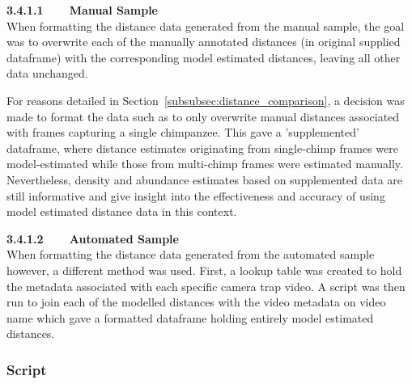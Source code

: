 \vspace{3mm}

\textbf{3.4.1.1~~~~Manual Sample}\vspace{4.5mm}\\
When formatting the distance data generated from the manual sample, the goal was to
overwrite each of the manually annotated distances (in original supplied dataframe)
with the corresponding model estimated distances, leaving all other data unchanged.

For reasons detailed in Section~\ref{subsubsec:distance_comparison}, a decision was
made to format the data such as to only overwrite manual distances associated with
frames capturing a single chimpanzee.
This gave a 'supplemented' dataframe, where distance estimates originating from
single-chimp frames were model-estimated while those from multi-chimp frames were
estimated manually.
Nevertheless, density and abundance estimates based on supplemented data are still
informative and give insight into the effectiveness and accuracy of using model estimated
distance data in this context.

\vspace{3mm}

\textbf{3.4.1.2~~~~Automated Sample}\vspace{4.5mm}\\
When formatting the distance data generated from the automated sample however, a
different method was used.
First, a lookup table was created to hold the metadata associated with each specific
camera trap video.
A script was then run to join each of the modelled distances with the video metadata
on video name which gave a formatted dataframe holding entirely model estimated distances.


\subsubsection{Script}